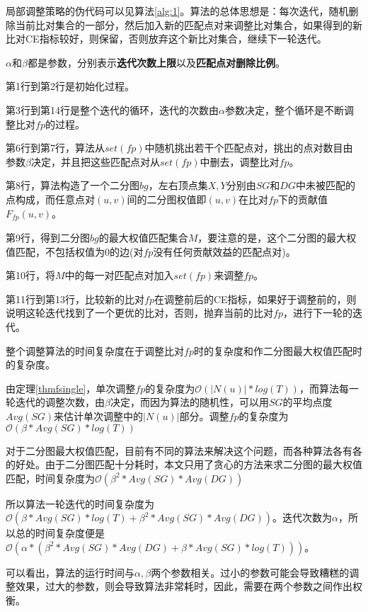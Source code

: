 局部调整策略的伪代码可以见算法\ref{alg:1}。算法的总体思想是：每次迭代，随机删除当前比对集合的一部分，然后加入新的匹配点对来调整比对集合，如果得到的新比对CE指标较好，则保留，否则放弃这个新比对集合，继续下一轮迭代。

$\alpha$和$\beta$都是参数，分别表示\textbf{迭代次数上限}以及\textbf{匹配点对删除比例}。

第1行到第2行是初始化过程。

第3行到第14行是整个迭代的循环，迭代的次数由$\alpha$参数决定，整个循环是不断调整比对$fp$的过程。

第6行到第7行，算法从$set(fp)$中随机挑出若干个匹配点对，挑出的点对数目由参数$\beta$决定，并且把这些匹配点对从$set(fp)$中删去，调整比对$fp$。

第8行，算法构造了一个二分图$bg$，左右顶点集$X,Y$分别由$SG$和$DG$中未被匹配的点构成，而任意点对$(u,v)$间的二分图权值即$(u,v)$在比对$fp$下的贡献值$F_{fp}(u,v)$。

第9行，得到二分图$bg$的最大权值匹配集合$M$，要注意的是，这个二分图的最大权值匹配，不包括权值为0的边(对$fp$没有任何贡献效益的匹配点对)。

第10行，将$M$中的每一对匹配点对加入$set(fp)$来调整$fp$。

第11行到第13行，比较新的比对$fp$在调整前后的CE指标，如果好于调整前的，则说明这轮迭代找到了一个更优的比对，否则，抛弃当前的比对$fp$，进行下一轮的迭代。

整个调整算法的时间复杂度在于调整比对$fp$时的复杂度和作二分图最大权值匹配时的复杂度。

由定理\ref{thmfsingle}，单次调整$fp$的复杂度为$\mathcal{O}(|N(u)|*log(T))$，而算法每一轮迭代的调整次数，由$\beta$决定，而因为算法的随机性，可以用$SG$的平均点度$Avg(SG)$来估计单次调整中的$|N(u)|$部分。调整$fp$的复杂度为$\mathcal{O}(\beta*Avg(SG)*log(T))$

对于二分图最大权值匹配，目前有不同的算法来解决这个问题，而各种算法各有各的好处。由于二分图匹配十分耗时，本文只用了贪心的方法来求二分图的最大权值匹配，时间复杂度为$\mathcal{O}(\beta^2*Avg(SG)*Avg(DG))$

所以算法一轮迭代的时间复杂度为$\mathcal{O}(\beta*Avg(SG)*log(T)+\beta^2*Avg(SG)*Avg(DG))$。迭代次数为$\alpha$，所以总的时间复杂度便是$\mathcal{O}(\alpha*(\beta^2*Avg(SG)*Avg(DG)+\beta*Avg(SG)*log(T)))$。

可以看出，算法的运行时间与$\alpha,\beta$两个参数相关。过小的参数可能会导致糟糕的调整效果，过大的参数，则会导致算法非常耗时，因此，需要在两个参数之间作出权衡。

